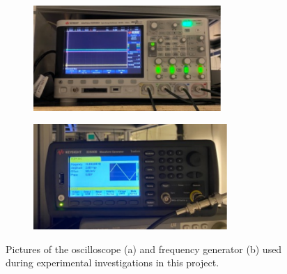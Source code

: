 \begin{figure}[h!]
    \centering
    \begin{subfigure}[b]{0.49\textwidth}
        \centering
        \includegraphics[height=4cm]{figures/scope.pdf}
        \caption{}
        \label{fig:scope}
    \end{subfigure}
    \begin{subfigure}[b]{0.49\textwidth}
        \centering
        \includegraphics[height=4cm]{figures/frequency_generator.pdf}
        \caption{}
        \label{fig:freq_generator}
    \end{subfigure}
    \caption{Pictures of the oscilloscope (a) and frequency generator (b) used during experimental investigations in this project.}
    \label{fig:scope_and_freq_generator}
\end{figure}
